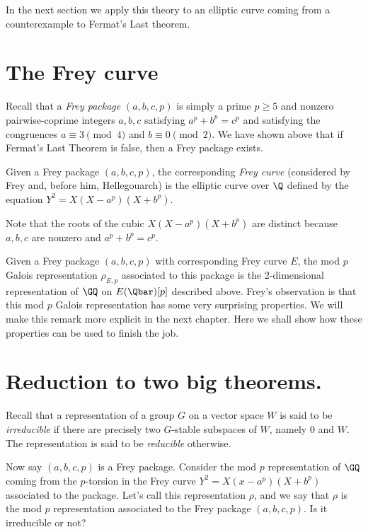 In the next section we apply this theory to an elliptic curve coming from a counterexample to
Fermat's Last theorem.

\section{The Frey curve}

Recall that a \emph{Frey package} $(a,b,c,p)$ is simply a prime $p\geq5$ and nonzero
pairwise-coprime integers $a,b,c$ satisfying $a^p+b^p=c^p$ and satisfying the congruences
$a\equiv3\pmod4$ and $b\equiv0\pmod2$. We have shown above that if Fermat's Last Theorem is false,
then a Frey package exists.

\begin{definition}[Frey]
  \label{FreyCurve}
  \leanok
  Given a Frey package $(a,b,c,p)$, the corresponding \emph{Frey curve} (considered by Frey and,
  before him, Hellegouarch) is the elliptic curve over $\Q$ defined by the equation
  $Y^2=X(X-a^p)(X+b^p).$
\end{definition}

Note that the roots of the cubic $X(X-a^p)(X+b^p)$ are distinct because $a,b,c$ are nonzero and
$a^p+b^p=c^p$.

Given a Frey package $(a,b,c,p)$ with corresponding Frey curve $E$, the mod $p$ Galois
representation $\rho_{E,p}$ associated to this package is the 2-dimensional representation of
$\GQ$ on $E(\Qbar)[p]$ described above. Frey's observation is that this mod $p$ Galois
representation has some very surprising properties. We will make this remark more explicit
in the next chapter. Here we shall show how these properties can be used to finish the job.

\section{Reduction to two big theorems.}

Recall that a representation of a group $G$ on a vector space $W$ is said to be \emph{irreducible}
if there are precisely two $G$-stable subspaces of $W$, namely $0$ and $W$.
The representation is said to be \emph{reducible} otherwise.

Now say $(a,b,c,p)$ is a Frey package.
Consider the mod $p$ representation of $\GQ$ coming from the $p$-torsion in the Frey
curve $Y^2=X(x-a^p)(X+b^p)$ associated to the package. Let's call this representation $\rho$,
and we say that $\rho$ is the mod $p$ representation associated to the Frey package $(a,b,c,p)$.
Is it irreducible or not?

